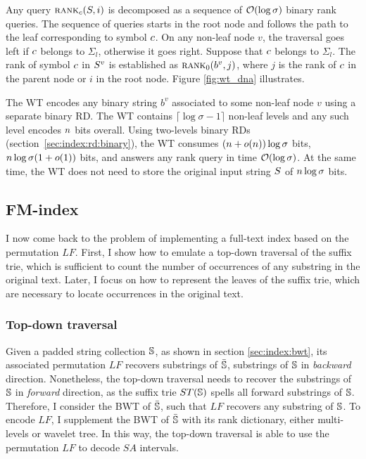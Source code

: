 Any query $\textsc{rank}_{c}(S,i)$ is decomposed as a sequence of $\mathcal{O}(\log{\sigma})$ binary rank queries.
The sequence of queries starts in the root node and follows the path to the leaf corresponding to symbol $c$.
On any non-leaf node $v$, the traversal goes left if $c$ belongs to $\Sigma_l$, otherwise it goes right.
Suppose \wlogs that $c$ belongs to $\Sigma_l$.
The rank of symbol $c$ in $S^v$ is established as $\textsc{rank}_0(b^v, j)$, where $j$ is the rank of $c$ in the parent node or $i$ in the root node.
Figure \ref{fig:wt_dna} illustrates.

The WT encodes any binary string $b^v$ associated to some non-leaf node $v$ using a separate binary RD.
The WT contains $\lceil \log \sigma - 1 \rceil$ non-leaf levels and any such level encodes $n$ bits overall.
Using two-levels binary RDs (section~\ref{sec:index:rd:binary}), the WT consumes $(n + o(n)) \log \sigma$ bits, \ie $n \log \sigma (1 + o(1))$ bits, and answers any rank query in time $\mathcal{O}(\log{\sigma})$.
At the same time, the WT does not need to store the original input string $S$ of $n \log \sigma$ bits.

\subsection{FM-index}
\label{sub:fmtrie}

I now come back to the problem of implementing a full-text index based on the permutation $LF$.
First, I show how to emulate a top-down traversal of the suffix trie, which is sufficient to count the number of occurrences of any substring in the original text.
Later, I focus on how to represent the leaves of the suffix trie, which are necessary to locate occurrences in the original text.

\subsubsection{Top-down traversal}

Given a padded string collection $\mathbb{S}$, as shown in section \ref{sec:index:bwt}, its associated permutation $LF$ recovers substrings of $\bar{\mathbb{S}}$, \ie substrings of $\mathbb{S}$ in \emph{backward} direction.
Nonetheless, the top-down traversal needs to recover the substrings of $\mathbb{S}$ in \emph{forward} direction, as the suffix trie $ST(\mathbb{S})$ spells all forward substrings of $\mathbb{S}$.
Therefore, I consider the BWT of $\bar{\mathbb{S}}$, such that $LF$ recovers any substring of $\mathbb{S}$.
To encode $LF$, I supplement the BWT of $\bar{\mathbb{S}}$ with its rank dictionary, either multi-levels or wavelet tree.
In this way, the top-down traversal is able to use the permutation $LF$ to decode $SA$ intervals.

